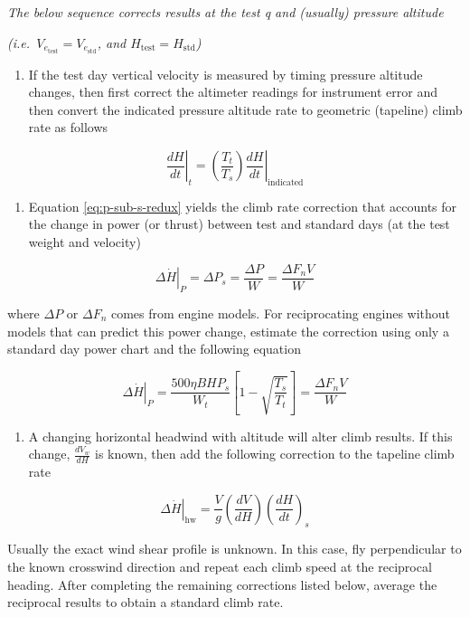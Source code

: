 \documentclass[
]{book}
\providecommand{\tightlist}{%
  \setlength{\itemsep}{0pt}\setlength{\parskip}{0pt}}
\begin{document}
\emph{The below sequence corrects results at the test q and (usually) pressure altitude}

\emph{(i.e.~\(V_{e_{\text{test}}} = V_{e_{\text{std}}}\), and \(H_{\text{test}} = H_{\text{std}}\))}

\begin{enumerate}
\def\labelenumi{\arabic{enumi}.}
\tightlist
\item
  If the test day vertical velocity is measured by timing pressure altitude
  changes, then first correct the altimeter readings for instrument error and
  then convert the indicated pressure altitude rate to geometric (tapeline) climb
  rate as follows
\end{enumerate}

\[
\left. \frac{dH}{dt} \right|_t = \left( \frac{T_t}{T_s} \right) \left. \frac{dH}{dt} \right|_{\text{indicated}} 
\]

\begin{enumerate}
\def\labelenumi{\arabic{enumi}.}
\setcounter{enumi}{1}
\tightlist
\item
  Equation \eqref{eq:p-sub-s-redux} yields the climb rate correction that
  accounts for the change in power (or thrust) between test and standard days
  (at the test weight and velocity)
\end{enumerate}

\[
\left. \Delta \dot{H} \right|_P = \Delta P_s = \frac{\Delta P}{W} = \frac{\Delta F_n V}{W}
\]

where \(\Delta P\) or \(\Delta F_n\) comes from engine models. For reciprocating
engines without models that can predict this power change, estimate the
correction using only a standard day power chart and the following equation

\[
\left. \Delta \dot{H} \right|_P = \frac{500 \eta B H P_s}{W_t} \left[ 1 - \sqrt{\frac{T_s}{T_t} } \right] = \frac{\Delta F_n V}{W}
\]

\begin{enumerate}
\def\labelenumi{\arabic{enumi}.}
\setcounter{enumi}{2}
\tightlist
\item
  A changing horizontal headwind with altitude will alter climb results. If
  this change, \(\frac{d V_w}{dH}\) is known, then add the following
  correction to the tapeline climb rate
\end{enumerate}

\[
\left. \Delta \dot{H} \right|_{\text{hw}} = \frac{V}{g} \left( \frac{dV}{dH} \right) \left( \frac{dH}{dt} \right)_s 
\]

Usually the exact wind shear profile is unknown. In this case, fly perpendicular
to the known crosswind direction and repeat each climb speed at the reciprocal
heading. After completing the remaining corrections listed below, average the
reciprocal results to obtain a standard climb rate.
\end{document}
